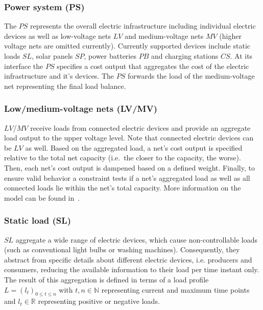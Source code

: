 \subsubsection*{Power system (PS)}

The $PS$ represents the overall electric infrastructure including individual electric devices as well as low-voltage nets $LV$ and medium-voltage nets $MV$ (higher voltage nets are omitted currently). Currently supported devices include static loads $SL$, solar panels $SP$, power batteries $PB$ and charging stations $CS$. At its interface the $PS$ specifies a cost output that aggregates the cost of the electric infrastructure and it's devices.
The $PS$ forwards the load of the medium-voltage net representing the final load balance.

\subsubsection*{Low/medium-voltage nets (LV/MV)}

$LV$/$MV$ receive loads from connected electric devices and provide an aggregate load output to the upper voltage level. Note that connected electric devices can be $LV$ as well. 
Based on the aggregated load, a net's cost output is specified relative to the total net capacity (i.e.\ the closer to the capacity, the worse). Then, each net's cost output is dampened based on a defined weight. Finally, to ensure valid behavior a constraint tests if a net's aggregated load as well as all connected loads lie within the net's total capacity. More information on the model can be found in~\cite{hackenberg2012applying}.

\subsubsection*{Static load (SL)}

$SL$ aggregate a wide range of electric devices, which cause non-controllable loads (such as conventional light bulbs or washing machines). Consequently, they abstract from specific details about different electric devices, i.e. producers and consumers, reducing the available information to their load per time instant only. The result of this aggregation is defined in terms of a load profile $L = (l_t)_{0 \leq t \leq n}$ with $t,n \in \mathbb{N}$ representing current and maximum time points and $l_t \in \mathbb{R}$ representing positive or negative loads.

